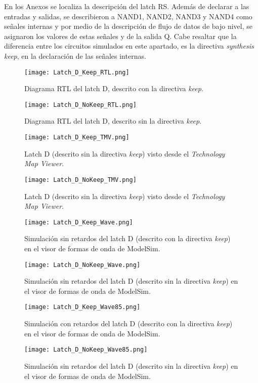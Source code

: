 En los Anexos se localiza la descripción del latch RS. Además de declarar a las entradas y salidas, se describieron a NAND1, NAND2, NAND3 y NAND4 como señales internas y por medio de la descripción de flujo de datos de bajo nivel, se asignaron los valores de estas señales y de la salida Q. Cabe resaltar que la diferencia entre los circuitos simulados en este apartado, es la directiva \textit{synthesis keep}, en la declaración de las señales internas.

\begin{figure}[ht]
	\centering
	\texttt{[image: Latch\_D\_Keep\_RTL.png]}
	\caption{Diagrama RTL del latch D, descrito con la directiva \textit{keep}. \label{fig:Latch_D_Keep_RTL}}
\end{figure}

\begin{figure}[ht]
	\centering
	\texttt{[image: Latch\_D\_NoKeep\_RTL.png]}
	\caption{Diagrama RTL del latch D, descrito sin la directiva \textit{keep}. \label{fig:Latch_D_NoKeep_RTL}}
\end{figure}

\begin{figure}[ht]
	\centering
	\texttt{[image: Latch\_D\_Keep\_TMV.png]}
	\caption{Latch D (descrito sin la directiva \textit{keep}) visto desde el \textit{Technology Map Viewer}. \label{fig:Latch_D_Keep_TMV}}
\end{figure}

\begin{figure}[ht]
	\centering
	\texttt{[image: Latch\_D\_NoKeep\_TMV.png]}
	\caption{Latch D (descrito sin la directiva \textit{keep}) visto desde el \textit{Technology Map Viewer}. \label{fig:Latch_D_NoKeep_TMV}}
\end{figure}

\begin{figure}[ht]
	\centering
	\texttt{[image: Latch\_D\_Keep\_Wave.png]}
	\caption{Simulación sin retardos del latch D (descrito con la directiva \textit{keep}) en el visor de formas de onda de ModelSim. \label{fig:Latch_D_Keep_Wave}}
\end{figure}

\begin{figure}[ht]
	\centering
	\texttt{[image: Latch\_D\_NoKeep\_Wave.png]}
	\caption{Simulación sin retardos del latch D (descrito sin la directiva \textit{keep}) en el visor de formas de onda de ModelSim. \label{fig:Latch_D_NoKeep_Wave}}
\end{figure}

\begin{figure}[ht]
	\centering
	\texttt{[image: Latch\_D\_Keep\_Wave85.png]}
	\caption{Simulación con retardos del latch D (descrito con la directiva \textit{keep}) en el visor de formas de onda de ModelSim. \label{fig:Latch_D_Keep_Wave85}}
\end{figure}

\begin{figure}[ht]
	\centering
	\texttt{[image: Latch\_D\_NoKeep\_Wave85.png]}
	\caption{Simulación sin retardos del latch D (descrito sin la directiva \textit{keep}) en el visor de formas de onda de ModelSim. \label{fig:Latch_D_NoKeep_Wave85}}
\end{figure}